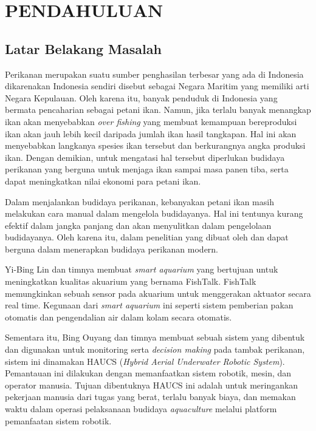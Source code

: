 
\chapter{PENDAHULUAN}

\section{Latar Belakang Masalah}

Perikanan merupakan suatu sumber penghasilan terbesar yang ada di Indonesia dikarenakan Indonesia sendiri disebut sebagai Negara Maritim yang memiliki arti Negara Kepulauan. Oleh karena itu, banyak penduduk di Indonesia yang bermata pencaharian sebagai petani ikan. Namun, jika terlalu banyak menangkap ikan akan menyebabkan \textit{over fishing} yang membuat kemampuan bereproduksi ikan akan jauh lebih kecil daripada jumlah ikan hasil tangkapan. Hal ini akan menyebabkan langkanya spesies ikan tersebut dan berkurangnya angka produksi ikan. Dengan demikian, untuk mengatasi hal tersebut diperlukan budidaya perikanan yang berguna untuk menjaga ikan sampai masa panen tiba, serta dapat meningkatkan nilai ekonomi para petani ikan.

Dalam menjalankan budidaya perikanan, kebanyakan petani ikan masih melakukan cara manual dalam mengelola budidayanya. Hal ini tentunya kurang efektif dalam jangka panjang dan akan menyulitkan dalam pengelolaan budidayanya. Oleh karena itu, dalam penelitian yang dibuat oleh \citep*{fishtalk} dan \citep*{haucs} dapat berguna dalam menerapkan budidaya perikanan modern.

Yi-Bing Lin dan timnya membuat \textit{smart aquarium} yang bertujuan untuk meningkatkan kualitas akuarium yang bernama FishTalk. FishTalk memungkinkan sebuah sensor pada akuarium untuk menggerakan aktuator secara real time. Kegunaan dari \textit{smart aquarium} ini seperti sistem pemberian pakan otomatis dan pengendalian air dalam kolam secara otomatis. \citep*{fishtalk}

Sementara itu, Bing Ouyang dan timnya membuat sebuah sistem yang dibentuk dan digunakan untuk monitoring serta \textit{decision making} pada tambak perikanan, sistem ini dinamakan HAUCS (\textit{Hybrid Aerial Underwater Robotic System}). Pemantauan ini dilakukan dengan memanfaatkan sistem robotik, mesin, dan operator manusia. Tujuan dibentuknya HAUCS ini adalah untuk meringankan pekerjaan manusia dari tugas yang berat, terlalu banyak biaya, dan memakan waktu dalam operasi pelaksanaan budidaya \textit{aquaculture} melalui platform pemanfaatan sistem robotik. \citep*{haucs}

